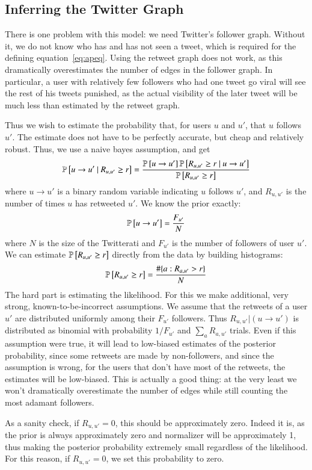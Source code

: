 \subsection{Inferring the Twitter Graph}

There is one problem with this model: we need Twitter's follower graph.
Without it, we do not know who has and has not seen a tweet, which is required for the defining equation~\eqref{eq:apeq}.  
Using the retweet graph does not work, as this dramatically overestimates the number of edges in the follower graph.
In particular, a user with relatively few followers who had one tweet go viral will see the rest of his tweets punished, as the actual visibility of the later tweet will be much less than estimated by the retweet graph.  

Thus we wish to estimate the probability that, for users $u$ and $u'$, that $u$ follows $u'$.
The estimate does not have to be perfectly accurate, but cheap and relatively robust.  
Thus, we use a naive bayes assumption, and get
\[\mathbb{P} \left[u\to u'~|~R_{u,u'}\ge r\right] = \frac{\mathbb{P} \left[u\to u'\right]\mathbb{P} \left[R_{u,u'}\ge r~|~u\to u'\right]}{\mathbb{P} \left[R_{u,u'}\ge r\right]}\]
where $u\to u'$ is a binary random variable indicating $u$ follows $u'$, and $R_{u,u'}$ is the number of times $u$ has retweeted $u'$.  
We know the prior exactly:
\[\mathbb{P} \left[u\to u'\right]=\frac{F_{u'}}{N}\]
where $N$ is the size of the Twitterati and $F_{u'}$ is the number of followers of user $u'$.
We can estimate $\mathbb{P} \left[R_{u,u'} \ge r\right]$ directly from the data by building histograms:
\[\mathbb{P} \left[R_{u,u'} \ge r\right]=\frac{\#\{a : R_{a,u'}>r\}}{N}\]
The hard part is estimating the likelihood.  For this we make additional, very strong, known-to-be-incorrect assumptions.
We assume that the retweets of a user $u'$ are distributed uniformly among their $F_{u'}$ followers.  
Thus $R_{u,u'}|(u\to u')$ is distributed as binomial with probability $1/F_{u'}$ and $\sum_a R_{a,u'}$ trials.  
Even if this assumption were true, it will lead to low-biased estimates of the posterior probability, since some retweets are made by non-followers, and since the assumption is wrong, for the users that don't have most of the retweets, the estimates will be low-biased.
This is actually a good thing: at the very least we won't dramatically overestimate the number of edges while still counting the most adamant followers.  

As a sanity check, if $R_{u,u'}=0$, this should be approximately zero.
Indeed it is, as the prior is always approximately zero and normalizer will be approximately 1, thus making the posterior probability extremely small regardless of the likelihood.  
For this reason, if $R_{u,u'}=0$, we set this probability to zero.

